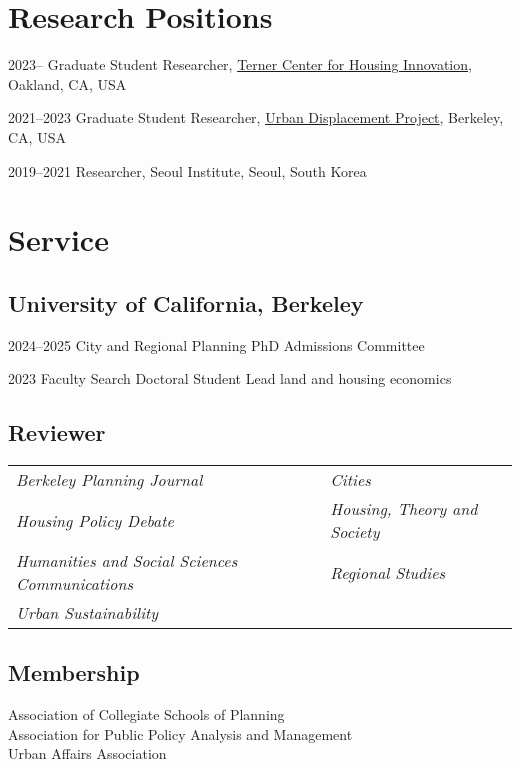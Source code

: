 \documentclass[11pt,letterpaper]{article}
\begin{document}
\section{Research Positions}
\begin{tablist}
  \item[2023– ] \tab{}Graduate Student Researcher, \href{https://ternercenter.berkeley.edu/}{Terner Center for Housing Innovation}, Oakland, CA, USA
  \item[2021–2023] \tab{}Graduate Student Researcher, \href{https://www.urbandisplacement.org/}{Urban Displacement Project}, Berkeley, CA, USA
  \item[2019–2021] \tab{}Researcher, Seoul Institute, Seoul, South Korea
\end{tablist}

\section{Service}

\subsection{University of California, Berkeley}
\begin{tablist}
  \item[2024–2025] \tab{}City and Regional Planning PhD Admissions Committee
  \item[2023] \tab{}Faculty Search Doctoral Student Lead land and housing economics
\end{tablist}

\subsection{Reviewer}
\begin{tabular}{@{}p{} p{}@{}}
\emph{Berkeley Planning Journal} & \emph{Cities}\\
\emph{Housing Policy Debate} & \emph{Housing, Theory and Society}\\
\emph{Humanities and Social Sciences Communications} & \emph{Regional Studies}\\
\emph{Urban Sustainability} &
\end{tabular}

\subsection{Membership}
Association of Collegiate Schools of Planning\\
Association for Public Policy Analysis and Management\\
Urban Affairs Association
\end{document}
